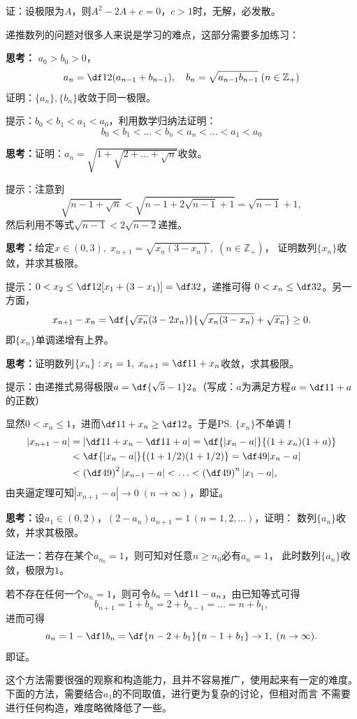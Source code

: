 证：设极限为$A$，则$A^2-2A+c=0$，$c>1$时，无解，必发散。\fin

\bs
递推数列的问题对很多人来说是学习的难点，这部分需要多加练习：

\bs
{\bf 思考：} $a_0>b_0>0$，
$$a_n=\df12(a_{n-1}+b_{n-1}),\quad
b_n=\sqrt{a_{n-1}b_{n-1}}\;(n\in\mathbb{Z}_+)$$
证明：$\{a_n\},\{b_n\}$收敛于同一极限。

\ifhint
提示：$b_0<b_1<a_1<a_0$，利用数学归纳法证明：
$$b_0<b_1<\ldots<b_n<a_n<\ldots<a_1<a_0$$
\fi

\bs
{\bf 思考：}证明：$a_n=\sqrt{1+\sqrt{2+\ldots+\sqrt{n}}}$收敛。

\ifhint
提示：注意到
$$\sqrt{n-1+\sqrt n}<\sqrt{n-1+2\sqrt{n-1}+1}=\sqrt{n-1}+1,$$
然后利用不等式$\sqrt{n-1}<2\sqrt{n-2}$递推。
\fi

\bs
{\bf 思考：}给定$x\in(0,3),\; x_{n+1}=\sqrt{x_n(3-x_n)},
\;(n\in\mathbb{Z}_+)$，
证明数列$\{x_n\}$收敛，并求其极限。

\ifhint
提示：$0<x_2\leq\df12[x_1+(3-x_1)]=\df32$，递推可得
$0<x_n\leq\df32$。另一方面，
$$x_{n+1}-x_n=\df{\sqrt{x_n}(3-2x_n)}{\sqrt{x_n(3-x_n)}
+\sqrt{x_n}}\geq 0.$$
即$\{x_n\}$单调递增有上界。
\fi

\bs
{\bf 思考：}证明数列$\{x_n\}:x_1=1,\;x_{n+1}
=\df1{1+x_n}$收敛，求其极限。

\ifhint
提示：由递推式易得极限$a=\df{\sqrt5-1}2$。（写成：$a$为满足方程$a=\df1{1+a}$的正数）

显然$0<x_n\leq1$，进而$\df1{1+x_n}\geq\df12$。于是\ps{$\{x_n\}$不单调！}
\begin{align}
	|x_{n+1}-a|&=\left|\df1{1+x_n}-\df1{1+a}\right|=\df{|x_n-a|}{(1+x_n)(1+a)}\notag\\
	&<\df{|x_n-a|}{(1+1/2)(1+1/2)}=\df49|x_n-a|\notag\\
	&<\left(\df49\right)^2|x_{n-1}-a|<\ldots<\left(\df49\right)^{n}|x_1-a|,\notag
\end{align}
由夹逼定理可知$|x_{n+1}-a|\to0\;(n\to\infty)$，即证。
\fi

\bs
{\bf 思考：}设$a_1\in(0,2)$，$(2-a_n)a_{n+1}=1\,(n=1,2,\ldots)$，证明：
数列$\{a_n\}$收敛，并求其极限。

\ifhint
证法一：若存在某个$a_{n_0}=1$，则可知对任意$n\geq n_0$必有$a_n=1$，
此时数列$\{a_n\}$收敛，极限为$1$。

若不存在任何一个$a_n=1$，则可令$b_n=\df1{1-a_n}$，由已知等式可得
$$b_{n+1}=1+b_n=2+b_{n-1}=\ldots=n+b_1,$$
进而可得
$$a_n=1-\df1{b_n}=\df{n-2+b_1}{n-1+b_1}\to 1,\;(n\to\infty).$$
即证。\fin

这个方法需要很强的观察和构造能力，且并不容易推广，使用起来有一定的难度。
下面的方法，需要结合$a_1$的不同取值，进行更为复杂的讨论，但相对而言
不需要进行任何构造，难度略微降低了一些。

